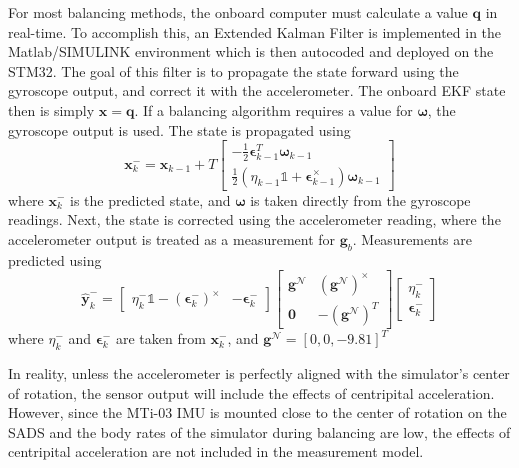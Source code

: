 For most balancing methods, the onboard computer must calculate a value $\bm{q}$ in real-time. To accomplish this, an Extended Kalman Filter is implemented in the Matlab/SIMULINK environment which is then autocoded and deployed on the STM32. The goal of this filter is to propagate the state forward using the gyroscope output, and correct it with the accelerometer. The onboard EKF state then is simply $\bm{x} = \bm{q}$. If a balancing algorithm requires a value for $\bm{\omega}$, the gyroscope output is used. The state is propagated using
\begin{equation}\label{equation:EKF_process}
    \bm{x}_k^-=\bm{x}_{k-1} + T\begin{bmatrix}
    
    -\frac{1}{2}\bm{\epsilon}_{k-1}^T\bm{\omega}_{k-1} \\
    \frac{1}{2}(\eta_{k-1}\mathbb{1} +
    \bm{\epsilon}_{k-1}^{\times})\bm{\omega}_{k-1}
\end{bmatrix}
\end{equation}
where $\bm{x}_k^-$ is the predicted state, and $\bm{\omega}$ is taken directly from the gyroscope readings. Next, the state is corrected using the accelerometer reading, where the accelerometer output is treated as a measurement for $\bm{g}_b$. Measurements are predicted using 
\begin{equation}\label{equation:EKF_meas}
    \hat{\bm{y}}_k^-=
    \begin{bmatrix}    
    \eta_k^-\mathbb{1}-(\bm{\epsilon}_k^-)^{\times} & -\bm{\epsilon}_k^-
    \end{bmatrix}
    \begin{bmatrix}    
    \bm{g}^\mathcal{N} & (\bm{g}^\mathcal{N})^{\times} \\
    \bm{0} & - (\bm{g}^\mathcal{N})^T
    \end{bmatrix}
    \begin{bmatrix}    
    \eta_k^- \\
    \bm{\epsilon}_k^-
    \end{bmatrix}
\end{equation}
where $\eta_k^-$ and $\bm{\epsilon}_k^-$ are taken from $\bm{x}_k^-$, and $\bm{g}^\mathcal{N}=[0, 0,-9.81]^T$

In reality, unless the accelerometer is perfectly aligned with the simulator's center of rotation, the sensor output will include the effects of centripital acceleration. However, since the MTi-03 IMU is mounted close to the center of rotation on the SADS and the body rates of the simulator during balancing are low, the effects of centripital acceleration are not included in the measurement model.

